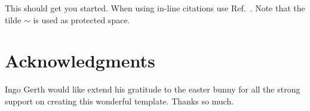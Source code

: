 \documentclass[%
]{aiaa-tc}
\begin{document}
This should get you started. When using in-line citations use
Ref.~. Note that the tilde $\sim$ is used as protected
space.


\section*{Acknowledgments}

Ingo Gerth would like extend his gratitude to the easter bunny for all the
strong support on creating this wonderful template. Thanks so much.




\end{document}
